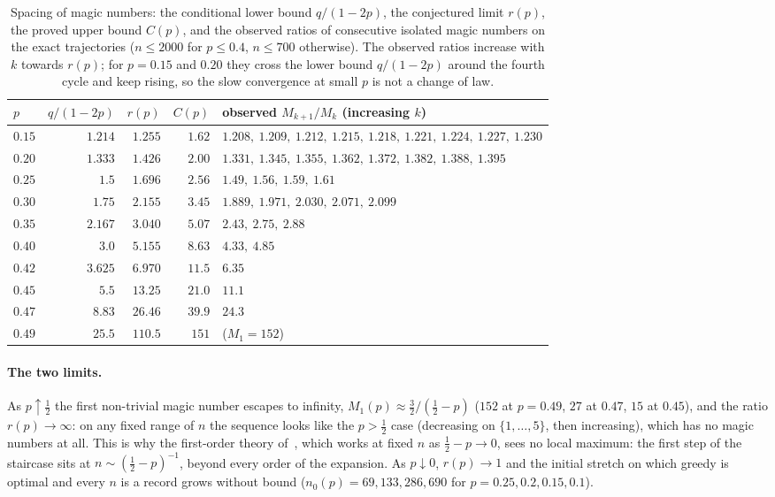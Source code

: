 \documentclass[11pt]{article}
\theoremstyle{definition}
\begin{document}
\begin{table}[h]
\centering
\small
\begin{tabular}{@{}lrrrl@{}}
\toprule
$p$ & $q/(1-2p)$ & $r(p)$ & $C(p)$ & observed $M_{k+1}/M_k$ (increasing $k$) \\
\midrule
$0.15$ & $1.214$ & $1.255$ & $1.62$ & $1.208,\ 1.209,\ 1.212,\ 1.215,\ 1.218,\ 1.221,\ 1.224,\ 1.227,\ 1.230$ \\
$0.20$ & $1.333$ & $1.426$ & $2.00$ & $1.331,\ 1.345,\ 1.355,\ 1.362,\ 1.372,\ 1.382,\ 1.388,\ 1.395$ \\
$0.25$ & $1.5$   & $1.696$ & $2.56$ & $1.49,\ 1.56,\ 1.59,\ 1.61$ \\
$0.30$ & $1.75$  & $2.155$ & $3.45$ & $1.889,\ 1.971,\ 2.030,\ 2.071,\ 2.099$ \\
$0.35$ & $2.167$ & $3.040$ & $5.07$ & $2.43,\ 2.75,\ 2.88$ \\
$0.40$ & $3.0$   & $5.155$ & $8.63$ & $4.33,\ 4.85$ \\
$0.42$ & $3.625$ & $6.970$ & $11.5$ & $6.35$ \\
$0.45$ & $5.5$   & $13.25$ & $21.0$ & $11.1$ \\
$0.47$ & $8.83$  & $26.46$ & $39.9$ & $24.3$ \\
$0.49$ & $25.5$  & $110.5$ & $151$  & ($M_1=152$) \\
\bottomrule
\end{tabular}
\caption{Spacing of magic numbers: the conditional lower bound
  $q/(1-2p)$, the conjectured limit $r(p)$, the proved upper bound
  $C(p)$, and the observed ratios of consecutive isolated magic
  numbers on the exact trajectories ($n\le2000$ for $p\le0.4$, $n\le700$
  otherwise).  The observed ratios increase with $k$ towards $r(p)$;
  for $p=0.15$ and $0.20$ they cross the lower bound $q/(1-2p)$ around
  the fourth cycle and keep rising, so the slow convergence at small
  $p$ is not a change of law.}\label{tab:ratio}
\end{table}

\paragraph{The two limits.}  As $p\uparrow\tfrac12$ the first
non-trivial magic number escapes to infinity, $M_1(p)\approx\tfrac32/(\tfrac12-p)$
($152$ at $p=0.49$, $27$ at $0.47$, $15$ at $0.45$), and the ratio
$r(p)\to\infty$: on any fixed range of $n$ the sequence looks like the
$p>\tfrac12$ case (decreasing on $\{1,\dots,5\}$, then increasing), which
has no magic numbers at all.  This is why the first-order theory
of~\cite{Paper1}, which works at fixed $n$ as $\tfrac12-p\to0$, sees no
local maximum: the first step of the staircase sits at $n\sim(\tfrac12-p)^{-1}$,
beyond every order of the expansion.  As $p\downarrow0$, $r(p)\to1$ and
the initial stretch on which greedy is optimal and every $n$ is a
record grows without bound ($n_0(p)=69,133,286,690$ for
$p=0.25,0.2,0.15,0.1$).
\end{document}
